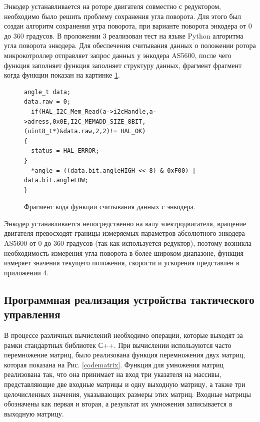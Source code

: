 Энкодер устанавливается на роторе двигателя совместно с редуктором, необходимо было решить проблему сохранения угла поворота. Для этого был создан алгоритм сохранения угра поворота, при варианте поворота энкодера от 0 до 360 градусов. В проложении 3 реализован тест на языке Python алгоритма угла поворота энкодера.
Для обеспечения считывания данных о положении ротора микрокотроллер отправляет запрос данных у энкодера AS5600, после чего функция заполняет функция заполняет структуру данных, фрагмент фрагмент когда функции показан на картинке \ref{codeencoder}.



\begin{figure}[H]
	\centering
	\begin{verbatim}
angle_t data;
data.raw = 0;
  if(HAL_I2C_Mem_Read(a->i2cHandle,a->adress,0x0E,I2C_MEMADD_SIZE_8BIT, (uint8_t*)&data.raw,2,2)!= HAL_OK) 
{
  status = HAL_ERROR;
}
  *angle = ((data.bit.angleHIGH << 8) & 0xF00) | data.bit.angleLOW;
}
	\end{verbatim}
	\caption{Фрагмент кода функции считывания данных с энкодера.}\label{codeencoder}
\end{figure}


Энкодер устанавливается непосредственно на валу электродвигателя, вращение двигателя превосходят границы измеряемых параметров абсолютного энкодера AS5600 от 0 до 360 градусов (так как используется редуктор), поэтому возникла необходимость измерения угла поворота в более широком диапазоне, функция измеряет значения текущего положения, скорости и ускорения представлен в приложении 4.





\subsection{Программная реализация устройства тактического управления}


В процессе различных вычислений необходимо операции, которые выходят за рамки стандартных библиотек С++. При вычислении используются часто перемножение матриц, было реализована функция перемножения двух матриц, которая показана на Рис. \ref{codematrix}. Функция для умножения матриц реализована так, что она принимает на вход три указателя на массивы, представляющие две входные матрицы и одну выходную матрицу, а также три целочисленных значения, указывающих размеры этих матриц. Входные матрицы обозначены как первая и вторая, а результат их умножения записывается в выходную матрицу.

